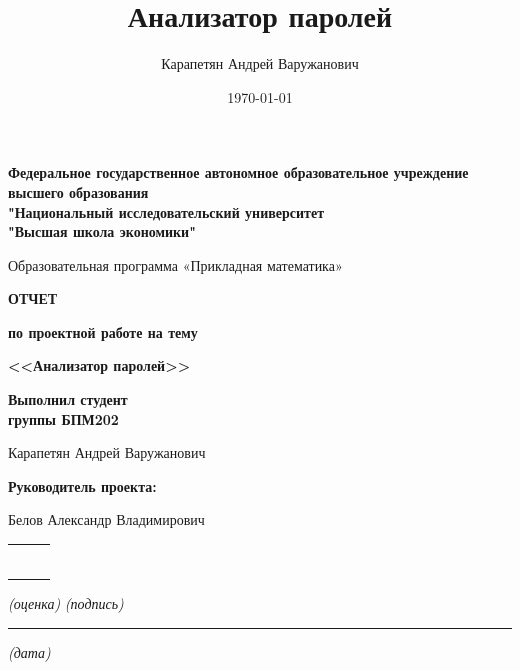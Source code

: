 \documentclass[a4paper,12pt]{article}
\author{Карапетян Андрей Варужанович}
\title{Анализатор паролей}
\date{\today}
\begin{document}
\begin{center}
\textbf{Федеральное государственное автономное образовательное учреждение высшего образования \\ "Национальный исследовательский университет \\ "Высшая школа экономики"}\\
\end{center}

\vspace{1em}

\begin{center}
Образовательная программа «Прикладная математика»


\end{center}

\vspace{3em}

\begin{center}
\textbf{ОТЧЕТ}

\textbf{по проектной работе на тему}
\end{center}

\begin{center}
\textbf{<<Анализатор паролей>>}
\end{center}

\vspace{3em}

\begin{flushright}
\textbf{Выполнил студент \\ группы БПМ202}
\vspace{0.6\baselineskip}

Карапетян Андрей Варужанович

\end{flushright}

\vspace{2em}

\begin{flushleft}
\textbf{Руководитель проекта:}
\vspace{1em}

 Белов Александр Владимирович

\vspace{\baselineskip}
\begin{tabular}{lcl}
    \rule{2cm}{0.3pt} & \hspace{1mm} & \rule{2.5cm}{0.3pt}
\end{tabular}

\quad \textit{(оценка)} \hspace{12mm} \textit{(подпись)}

\vspace{1.2\baselineskip}

\rule{5cm}{0.3pt}

\hspace{17mm} \textit{(дата)}
\end{flushleft}
\end{document}
